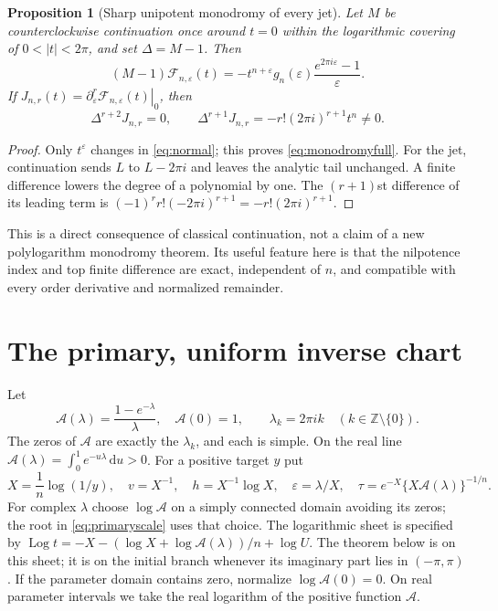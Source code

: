 \documentclass[11pt,a4paper]{article}
\numberwithin{equation}{section}
\newtheorem{proposition}[theorem]{Proposition}
\theoremstyle{definition}\newtheorem{definition}[theorem]{Definition}
\theoremstyle{remark}\newtheorem{remark}[theorem]{Remark}
\DeclareMathOperator{\Log}{Log}
\newcommand{\dd}{\,\mathrm d}\newcommand{\eps}{\varepsilon}
\newcommand{\F}{\mathcal F}\newcommand{\B}{\mathcal B}
\newcommand{\A}{\mathcal A}\newcommand{\E}{\mathcal E}
\begin{document}
\begin{proposition}[Sharp unipotent monodromy of every jet]\label{prop:monodromy}
Let $M$ be counterclockwise continuation once around $t=0$ within the
logarithmic covering of $0<|t|<2\pi$, and set $\Delta=M-1$. Then
\begin{equation}\label{eq:monodromyfull}
 (M-1)\F_{n,\eps}(t)
 =-t^{n+\eps}g_n(\eps)\frac{e^{2\pi i\eps}-1}{\eps}.
\end{equation}
If $J_{n,r}(t)=\left.\partial_\eps^r\F_{n,\eps}(t)\right|_0$, then
\begin{equation}\label{eq:monodromyjet}
 \Delta^{r+2}J_{n,r}=0,\qquad
 \Delta^{r+1}J_{n,r}=-r!(2\pi i)^{r+1}t^n\ne0.
\end{equation}
\end{proposition}
\begin{proof}
Only $t^{\eps}$ changes in \eqref{eq:normal}; this proves
\eqref{eq:monodromyfull}. For the jet, continuation sends
$L$ to $L-2\pi i$ and leaves the analytic tail unchanged. A finite
difference lowers the degree of a polynomial by one. The $(r+1)$st
difference of its leading term is
$(-1)^rr!(-2\pi i)^{r+1}=-r!(2\pi i)^{r+1}$.
\end{proof}
This is a direct consequence of classical continuation, not a claim of a
new polylogarithm monodromy theorem. Its useful feature here is that the
nilpotence index and top finite difference are exact, independent of $n$,
and compatible with every order derivative and normalized remainder.

\section{The primary, uniform inverse chart}
\label{sec:primary}
Let
\begin{equation}\label{eq:A}
 \A(\lambda)=\frac{1-e^{-\lambda}}{\lambda},\quad\A(0)=1,
 \qquad \lambda_k=2\pi i k\quad(k\in\mathbb Z\setminus\{0\}).
\end{equation}
The zeros of $\A$ are exactly the $\lambda_k$, and each is simple. On the
real line $\A(\lambda)=\int_0^1 e^{-u\lambda}\dd u>0$.
For a positive target $y$ put
\begin{equation}\label{eq:primaryscale}
 X=\frac1n\log(1/y),\quad v=X^{-1},\quad h=X^{-1}\log X,
 \quad\eps=\lambda/X,\quad
 \tau=e^{-X}\{X\A(\lambda)\}^{-1/n}.
\end{equation}
For complex $\lambda$ choose $\log\A$ on a simply connected domain avoiding
its zeros; the root in \eqref{eq:primaryscale} uses that choice. The
logarithmic sheet is specified by
$\Log t=-X-(\log X+\log\A(\lambda))/n+\log U$.
The theorem below is on this sheet; it is on the initial branch whenever
its imaginary part lies in $(-\pi,\pi)$. If the parameter domain contains zero, normalize $\log\A(0)=0$.
On real parameter intervals we take the real logarithm of the positive
function $\A$.
\end{document}
